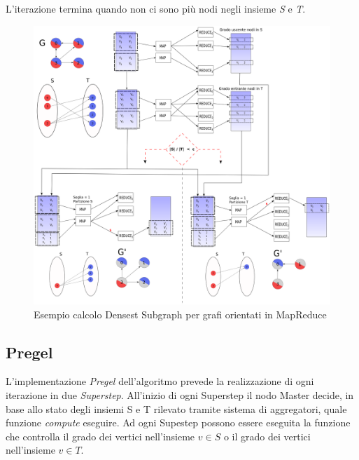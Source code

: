 \documentclass[LaM,binding=0.6cm]{sapthesis}
\begin{document}
L'iterazione termina quando non ci sono più nodi negli insieme \textit{S} e \textit{T}.


\begin{minipage}{\linewidth}

\end{minipage}
\begin{minipage}{\linewidth}

\end{minipage}


\begin{figure}
\centering	
 \includegraphics[width=1\textwidth]{MR-denesestD}
\caption{Esempio calcolo Densest Subgraph per grafi orientati in MapReduce}
\label{fig:MRDENSESESTD}
\end{figure}

\subsection{Pregel}

L'implementazione \textit{Pregel} dell'algoritmo prevede la realizzazione di ogni iterazione in due \textit{Superstep}.
 All'inizio di ogni Superstep il nodo Master decide, in base allo stato degli insiemi S e T rilevato tramite sistema di aggregatori, quale funzione \textit{compute} eseguire. Ad ogni Supestep possono essere eseguita la funzione che controlla il grado dei vertici nell'insieme \textit{$v \in S$} o il grado dei vertici nell'insieme \textit{$v \in T$}. 
\end{document}
